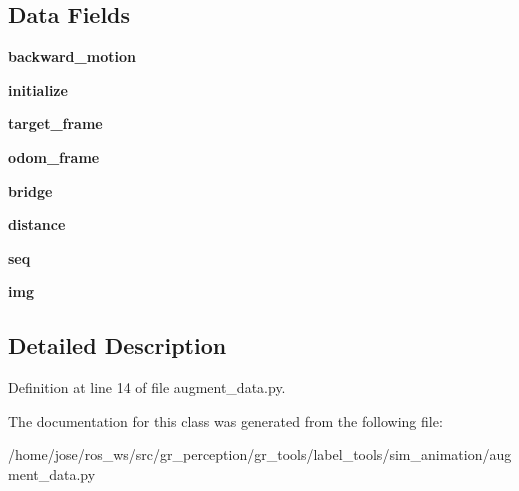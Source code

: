 \subsection*{Data Fields}
\begin{DoxyCompactItemize}
\item 
\mbox{\label{classsim__animation_1_1augment__data_1_1DatasetAugmenter_a76b028934c4d0aedfb0ac4dc1f01924a}} 
{\bfseries backward\+\_\+motion}
\item 
\mbox{\label{classsim__animation_1_1augment__data_1_1DatasetAugmenter_a424a10f8bf024627060cd3b750c0d24d}} 
{\bfseries initialize}
\item 
\mbox{\label{classsim__animation_1_1augment__data_1_1DatasetAugmenter_a014de16862dd70ccf73f5d7a76a0b27d}} 
{\bfseries target\+\_\+frame}
\item 
\mbox{\label{classsim__animation_1_1augment__data_1_1DatasetAugmenter_a9a84da9c3dc8580c2d20f2aef446728a}} 
{\bfseries odom\+\_\+frame}
\item 
\mbox{\label{classsim__animation_1_1augment__data_1_1DatasetAugmenter_a29b5393606c31f00f4a48c8641ca57a8}} 
{\bfseries bridge}
\item 
\mbox{\label{classsim__animation_1_1augment__data_1_1DatasetAugmenter_adb16953207803bb503fcc73f2088878f}} 
{\bfseries distance}
\item 
\mbox{\label{classsim__animation_1_1augment__data_1_1DatasetAugmenter_aa557590a7400b19ee380869e1a0289d2}} 
{\bfseries seq}
\item 
\mbox{\label{classsim__animation_1_1augment__data_1_1DatasetAugmenter_a0c06e4dff27ef15ef770913221c42839}} 
{\bfseries img}
\end{DoxyCompactItemize}


\subsection{Detailed Description}


Definition at line 14 of file augment\+\_\+data.\+py.



The documentation for this class was generated from the following file\+:\begin{DoxyCompactItemize}
\item 
/home/jose/ros\+\_\+ws/src/gr\+\_\+perception/gr\+\_\+tools/label\+\_\+tools/sim\+\_\+animation/augment\+\_\+data.\+py\end{DoxyCompactItemize}
